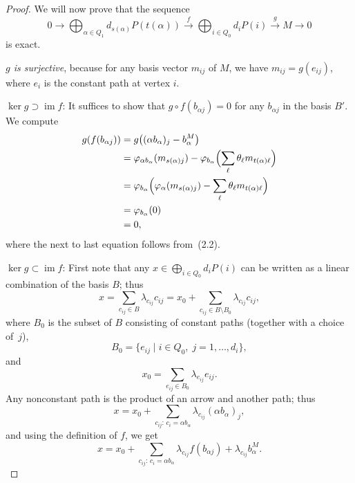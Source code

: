 \documentclass[11pt, a4paper]{report}
\begin{document}
\begin{proof}
        We will now prove that the sequence
        \begin{equation}
        0 \longrightarrow \bigoplus_{\alpha\in Q_1} d_{s(\alpha)}P(t(\alpha))
        \xrightarrow{\,f\,}
        \bigoplus_{i\in Q_0} d_iP(i)
        \xrightarrow{\,g\,}
        M \longrightarrow 0
        \tag{2.3}
        \end{equation}
        is exact.

        \emph{$g$ is surjective}, because for any basis vector $m_{ij}$ of $M$, we have
        $m_{ij}=g(e_{ij})$, where $e_i$ is the constant path at vertex $i$.

        \emph{$\ker g \supset \operatorname{im} f$}: It suffices to show that
        $g\circ f(b_{\alpha j})=0$ for any $b_{\alpha j}$ in the basis $B'$. We compute
        \[
        \begin{aligned}
        g(f(b_{\alpha j}))
        &=g\bigl((\alpha b_\alpha)_j-b_\alpha^M\bigr) \\
        &=\varphi_{\alpha b_\alpha}(m_{s(\alpha)j})
        -\varphi_{b_\alpha}\Bigl(\sum_\ell \theta_\ell m_{t(\alpha)\ell}\Bigr) \\
        &=\varphi_{b_\alpha}\Bigl(\varphi_\alpha(m_{s(\alpha)j})
        -\sum_\ell \theta_\ell m_{t(\alpha)\ell}\Bigr) \\
        &=\varphi_{b_\alpha}(0) \\
        &=0,
        \end{aligned}
        \]
        where the next to last equation follows from~(2.2).

        \emph{$\ker g \subset \operatorname{im} f$}: First note that any
        $x\in \bigoplus_{i\in Q_0} d_iP(i)$ can be written as a linear combination of the basis
        $B$; thus
        \[
        x=\sum_{c_{ij}\in B}\lambda_{c_{ij}}c_{ij}
        =
        x_0+\sum_{c_{ij}\in B\setminus B_0}\lambda_{c_{ij}}c_{ij},
        \]
        where $B_0$ is the subset of $B$ consisting of constant paths (together with a choice of~$j$),
        \[
        B_0=\{e_{ij}\mid i\in Q_0,\; j=1,\ldots,d_i\},
        \]
        and
        \[
        x_0=\sum_{e_{ij}\in B_0}\lambda_{e_{ij}}e_{ij}.
        \]
        Any nonconstant path is the product of an arrow and another path; thus
        \[
        x=x_0+\sum_{c_{ij}:\,c_i=\alpha b_\alpha}\lambda_{c_{ij}}(\alpha b_\alpha)_j,
        \]
        and using the definition of $f$, we get
        \begin{equation}
        x=x_0+\sum_{c_{ij}:\,c_i=\alpha b_\alpha}\lambda_{c_{ij}}f(b_{\alpha j})
        +\lambda_{c_{ij}}b_\alpha^M.
        \tag{2.4}
        \end{equation}


\end{proof}
\end{document}
